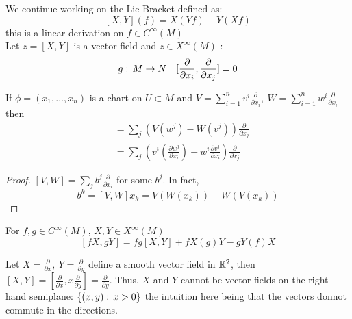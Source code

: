 We continue working on the Lie Bracket defined as:
$$[X,Y](f) = X(Yf) - Y(Xf)$$
this is a linear derivation on $f\in C^\infty (M)$ \\
Let $z=[X,Y]$ is a vector field and $z\in X^\infty (M)$ :
$$g:\, M\to N \quad [ \frac{\partial}{\partial x_i} , \frac{\partial}{\partial x_j} ]=0$$

\begin{teorema}
If $\phi=(x_1,\ldots, x_n)$ is a chart on $U\subset M$ and $V=\sum_{i=1}^n v^i \frac{\partial}{\partial x_i},\ W = \sum_{i=1}^n w^i \frac{\partial}{\partial x_i} $
then 
\begin{align*}
 [V,W] &= \sum_j \left( V(w^j) - W(v^j) \right) \frac{\partial}{\partial x_j}  \\
       &= \sum_j \left( v^i(\frac{\partial w^j}{\partial x_i} ) - w^i \frac{\partial v^j }{\partial x_i} \right) \frac{\partial}{\partial x_j}  
\end{align*}

\begin{proof}
$[V,W] = \sum_j b^j \frac{\partial}{\partial x_i}$ for some $b^j$. In fact, 
$$ b^k = [V,W] x_k = V(W( x_k)) - W(V(x_k))$$
\end{proof}
\end{teorema}

\begin{teorema}
    For $f,g \in C^\infty (M)$, $X,Y\in X^\infty (M)$
    $$ [fX, gY] = fg[X,Y] + fX(g) Y - gY(f) X$$
\end{teorema}

\begin{examples}
    Let $X= \frac{\partial}{\partial x}, \ Y= \frac{\partial}{\partial y}  $ define a smooth vector field in $\mathbb{R}^2$, then $[X,Y]= [\frac{\partial}{\partial x}, x\frac{\partial}{\partial y}  ]=\frac{\partial}{\partial y} $. Thus, $X$ and $Y$ cannot be vector fields on the right hand semiplane: $\{(x,y):\, x>0 \}$ the intuition here being that the vectors donnot commute in the directions.
\end{examples}

